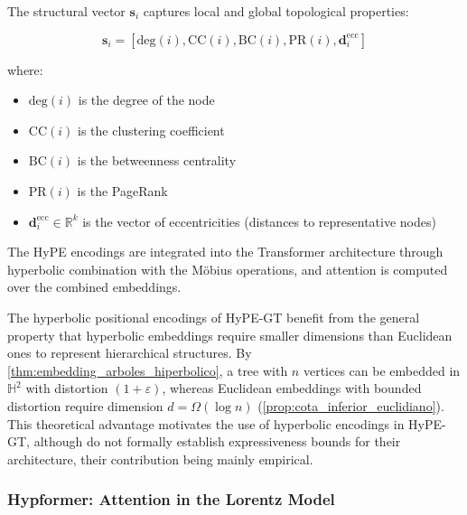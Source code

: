 \begin{definition}\label{def:structural_vector}
The structural vector $\mathbf{s}_i$ captures local and global topological properties:

\begin{equation}
\mathbf{s}_i = [\text{deg}(i), \text{CC}(i), \text{BC}(i), \text{PR}(i), \mathbf{d}_i^{\text{ecc}}]
\end{equation}

where:
\begin{itemize}
    \item $\text{deg}(i)$ is the degree of the node
    \item $\text{CC}(i)$ is the clustering coefficient
    \item $\text{BC}(i)$ is the betweenness centrality
    \item $\text{PR}(i)$ is the PageRank
    \item $\mathbf{d}_i^{\text{ecc}} \in \mathbb{R}^k$ is the vector of eccentricities (distances to representative nodes)
\end{itemize}
\end{definition}

The HyPE encodings are integrated into the \gls{Transformer} architecture through hyperbolic combination with the Möbius operations, and attention is computed over the combined embeddings.

\begin{remark}\label{rem:hypegt_expressiveness}
The hyperbolic positional encodings of HyPE-GT \citep{hypegt2023} benefit from the general property that hyperbolic embeddings require smaller dimensions than Euclidean ones to represent hierarchical structures. By \autoref{thm:embedding_arboles_hiperbolico}, a tree with $n$ vertices can be embedded in $\mathbb{H}^2$ with distortion $(1+\varepsilon)$, whereas Euclidean embeddings with bounded distortion require dimension $d = \Omega(\log n)$ (\autoref{prop:cota_inferior_euclidiano}). This theoretical advantage motivates the use of hyperbolic encodings in HyPE-GT, although \citet{hypegt2023} do not formally establish expressiveness bounds for their architecture, their contribution being mainly empirical.
\end{remark}


\subsubsection{Hypformer: Attention in the Lorentz Model}\label{subsubsec:hypformer_lorentz}

